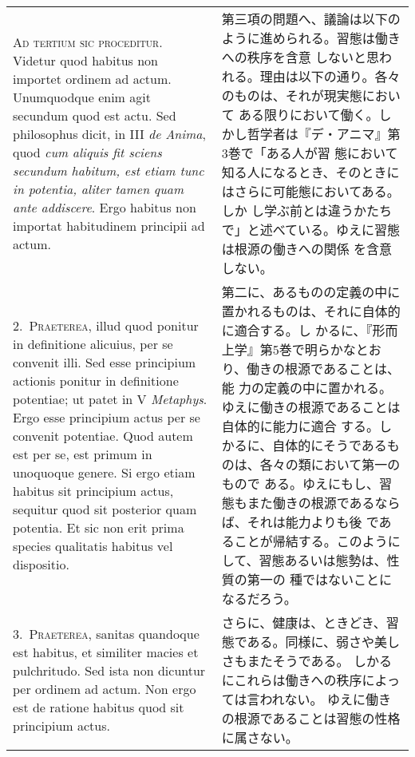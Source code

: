 \documentclass[10pt]{jsarticle} %
\begin{document}
\begin{longtable}{p{21em}p{21em}}
{\scshape Ad tertium sic proceditur}. Videtur quod habitus non importet ordinem
ad actum. Unumquodque enim agit secundum quod est actu. Sed
philosophus dicit, in III {\itshape de Anima}, quod {\itshape cum aliquis fit sciens
secundum habitum, est etiam tunc in potentia, aliter tamen quam ante
addiscere}. Ergo habitus non importat habitudinem principii ad actum.

&

第三項の問題へ、議論は以下のように進められる。習態は働きへの秩序を含意
しないと思われる。理由は以下の通り。各々のものは、それが現実態において
ある限りにおいて働く。しかし哲学者は『デ・アニマ』第3巻で「ある人が習
態において知る人になるとき、そのときにはさらに可能態においてある。しか
し学ぶ前とは違うかたちで」と述べている。ゆえに習態は根源の働きへの関係
を含意しない。

\\



2.~{\scshape Praeterea}, illud quod ponitur in definitione alicuius, per se convenit
illi. Sed esse principium actionis ponitur in definitione potentiae;
ut patet in V {\itshape Metaphys}. Ergo esse principium actus per se convenit
potentiae. Quod autem est per se, est primum in unoquoque genere. Si
ergo etiam habitus sit principium actus, sequitur quod sit posterior
quam potentia. Et sic non erit prima species qualitatis habitus vel
dispositio.

&

第二に、あるものの定義の中に置かれるものは、それに自体的に適合する。し
かるに、『形而上学』第5巻で明らかなとおり、働きの根源であることは、能
力の定義の中に置かれる。ゆえに働きの根源であることは自体的に能力に適合
する。しかるに、自体的にそうであるものは、各々の類において第一のもので
ある。ゆえにもし、習態もまた働きの根源であるならば、それは能力よりも後
であることが帰結する。このようにして、習態あるいは態勢は、性質の第一の
種ではないことになるだろう。


\\



3.~{\scshape Praeterea}, sanitas quandoque est habitus, et similiter macies et
pulchritudo. Sed ista non dicuntur per ordinem ad actum. Non ergo est
de ratione habitus quod sit principium actus.

&

さらに、健康は、ときどき、習態である。同様に、弱さや美しさもまたそうである。
しかるにこれらは働きへの秩序によっては言われない。
ゆえに働きの根源であることは習態の性格に属さない。


\end{longtable}
\end{document}
